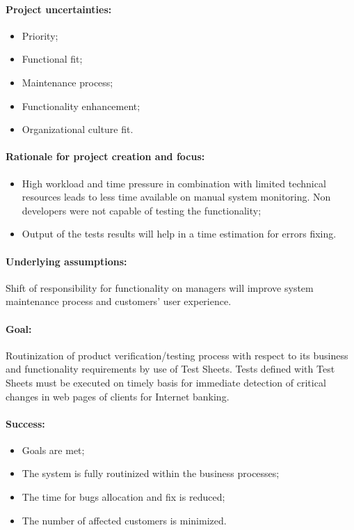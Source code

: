 \paragraph{Project uncertainties:}
\begin{itemize}
	\item Priority;
	\item Functional fit;
	\item Maintenance process;
	\item Functionality enhancement;
	\item Organizational culture fit.
\end{itemize}

\paragraph{Rationale for project creation and focus:} 
\begin{itemize}
	\item High workload and time pressure in combination with limited technical resources leads to less time available on manual system monitoring. Non developers were not capable of testing the functionality;
	\item Output of the tests results will help in a time estimation for errors fixing.
\end{itemize}


\paragraph{Underlying assumptions:} Shift of responsibility for functionality  on managers will improve system maintenance process and customers' user experience. 

\paragraph{Goal:} Routinization of product verification/testing process with respect to its business and functionality requirements by use of Test Sheets. Tests defined with Test Sheets must be executed on timely basis for immediate detection of critical changes in web pages of clients for Internet banking.

\paragraph{Success:}
\begin{itemize}
	\item Goals are met;
	\item The system is fully routinized within the business processes;
	\item The time for bugs allocation and fix is reduced;
	\item The number of affected customers is minimized.
\end{itemize}


